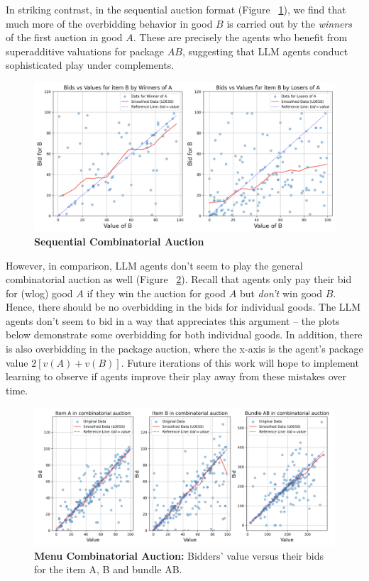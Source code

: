 \documentclass{article} %
\begin{document}
In striking contrast, in the sequential auction format (Figure ~\ref{fig:sequ}), we find that much more of the overbidding behavior in good $B$ is carried out by the \textit{ winners} of the first auction in good $A$. 
These are precisely the agents who benefit from superadditive valuations for package $AB$, suggesting that LLM agents conduct sophisticated play under complements. 
\begin{figure}[h!]
    \centering \includegraphics[width=0.9\linewidth]{Figs/Sequ.png}
    \caption{\textbf{Sequential Combinatorial Auction} }
    \label{fig:sequ}
\end{figure}

However, in comparison, LLM agents don't seem to play the general combinatorial auction as well (Figure ~\ref{fig:menu}). 
Recall that agents only pay their bid for (wlog) good $A$ if they win the auction for good $A$ but \textit{don't} win good $B$.
Hence, there should be no overbidding in the bids for individual goods. 
The LLM agents don't seem to bid in a way that appreciates this argument -- the plots below demonstrate some overbidding for both individual goods. 
In addition, there is also overbidding in the package auction, where the x-axis is the agent's package value $2[v(A) + v(B)]$. 
Future iterations of this work will hope to implement learning to observe if agents improve their play away from these mistakes over time.

\begin{figure}[h]
    \centering \includegraphics[width=\linewidth]{Figs/menu.png}
    \caption{\textbf{Menu Combinatorial Auction:} Bidders' value versus their bids for the item A, B and bundle AB. }
    \label{fig:menu}
\end{figure}
\end{document}
